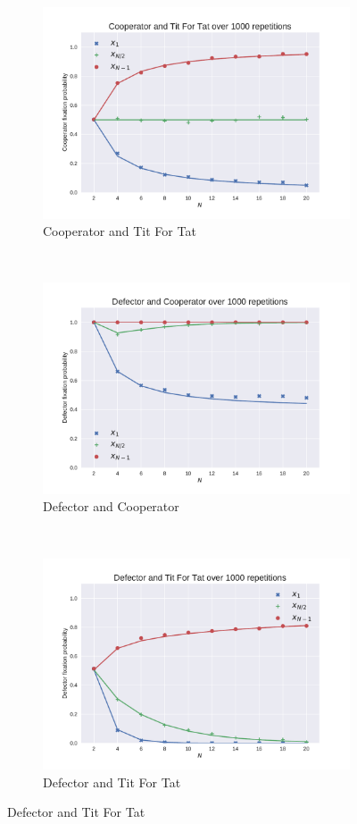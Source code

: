 \documentclass{article}
\begin{document}
\begin{figure}[!hbtp]
    \begin{subfigure}[t]{.3\textwidth}
        \centering
        \includegraphics[width=.8\textwidth]{./img/Cooperator_v_Tit_For_Tat.pdf}
        \caption{Cooperator and Tit For Tat}
    \end{subfigure}%
    ~
    \begin{subfigure}[t]{.3\textwidth}
        \centering
        \includegraphics[width=.8\textwidth]{./img/Defector_v_Cooperator.pdf}
        \caption{Defector and Cooperator}
    \end{subfigure}%
    ~
    \begin{subfigure}[t]{.3\textwidth}
        \centering
        \includegraphics[width=.8\textwidth]{./img/Defector_v_Tit_For_Tat.pdf}
        \caption{Defector and Tit For Tat}
    \end{subfigure}%


\end{figure}
\end{document}
